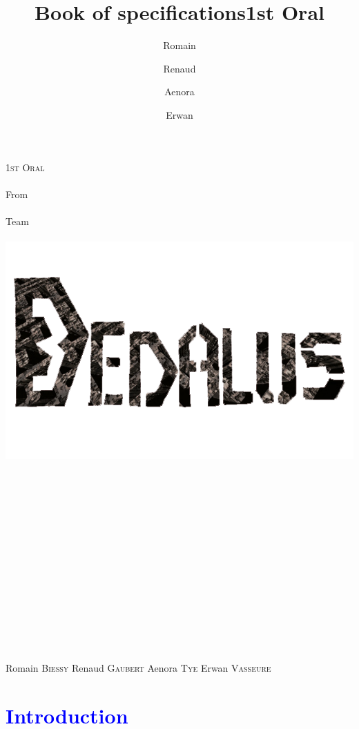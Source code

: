 \documentclass[article]{report} %
\title {Book of specifications}
\title {1st Oral}
\author {Romain\and Renaud\and Aenora\and Erwan}
\date {}
\begin{document}
		\thispagestyle{empty}
  			\begin{titlepage} 
						\vspace*{1cm} 
  					\begin{center} 
  							{\huge{\textsc{1st Oral} \\ ~ \\{\large From}\\ ~\\ Team \\  ~ \\ }}
	  						\includegraphics[width = 14cm]{Images/Dedalus.png}
							\\ ~ \\ ~ \\ ~ \\ ~ \\ ~ \\ ~ \\ ~ \\ ~ \\ ~ \\ ~ \\ ~ \\ ~ \\ ~ \\ ~ 
						\end{center}
  					\hfill {\large Romain \textsc{Biessy}}
  					\hfill {\large Renaud \textsc{Gaubert}}
  					\hfill {\large Aenora \textsc{Tye}}
  					\hfill {\large Erwan  \textsc{Vasseure}}
  			\end{titlepage} 

  	\tableofcontents
  			\newpage
				\chapter{\textcolor{blue}{Introduction}}
\end{document}
